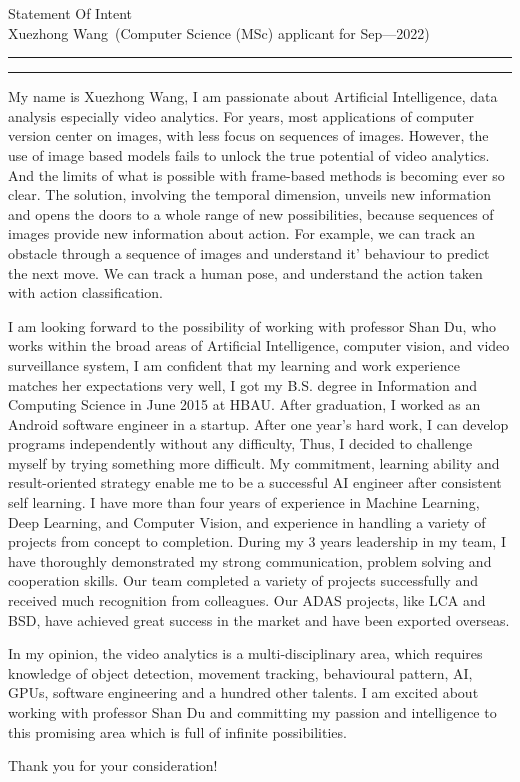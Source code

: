 \documentclass[12pt]{article}
\newcommand{\soptitle}{Statement Of Intent}
\newcommand{\yourname}{Xuezhong Wang}
\begin{document}
\begin{center}\LARGE\soptitle\\
\large \yourname\ (Computer Science (MSc) applicant for Sep---2022)
\end{center}

\hrule
\vspace{1pt}
\hrule height 1pt

\sffamily
\mdseries

\bigskip
My name is Xuezhong Wang, I am passionate about Artificial Intelligence, data analysis especially video analytics. For years, most applications of computer version center on images, with less focus on sequences of images. However, the use of image based models fails to unlock the true potential of video analytics. And the limits of what is possible with frame-based methods is becoming ever so clear. The solution, involving the temporal dimension, unveils new information and opens the doors to a whole range of new possibilities, because sequences of images provide new information about action. For example, we can track an obstacle through a sequence of images and understand it’ behaviour to predict the next move. We can track a human pose, and understand the action taken with action classification.


\bigskip

I am looking forward to the possibility of working with professor Shan Du, who works within the broad areas of Artificial Intelligence, computer vision, and video surveillance system, I am confident that my learning and work experience matches her expectations very well, I got my B.S. degree in Information and Computing Science in June 2015 at HBAU. After graduation, I worked as an Android software engineer in a startup. After one year's hard work, I can develop programs independently without any difficulty, Thus, I decided to challenge myself by trying something more difficult. My commitment, learning ability and result-oriented strategy enable me to be a successful AI engineer after consistent self learning. I have more than four years of experience in Machine Learning, Deep Learning, and Computer Vision, and experience in handling a variety of projects from concept to completion. During my 3 years leadership in my team, I have thoroughly demonstrated my strong communication, problem solving and cooperation skills. Our team completed a variety of projects successfully and received much recognition from colleagues. Our ADAS projects, like LCA and BSD, have achieved great success in the market and have been exported overseas.

\bigskip

In my opinion, the video analytics is a multi-disciplinary area, which requires knowledge of object detection, movement tracking, behavioural pattern,  AI, GPUs, software engineering and a hundred other talents. I am excited about working with professor Shan Du and committing my passion and intelligence to this promising area which is full of infinite possibilities.

\bigskip

Thank you for your consideration!
\end{document}
